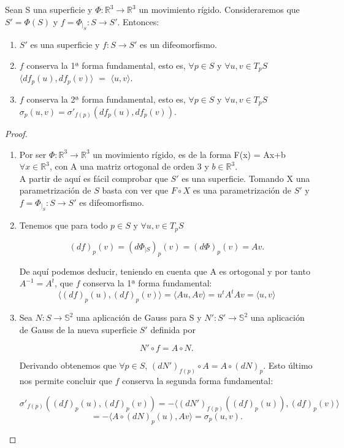 \begin{proposicion}\label{prop:rig1}
	Sean S una superficie y  $\Phi : \mathbb{R}^3 \to \mathbb{R}^3$  un movimiento rígido. Consideraremos que $S' = \Phi(S)$ y $f = \Phi_{\mid_{S}} : S \to S'$. Entonces:
	\begin{enumerate}
		\item $S'$ es una superficie y $f : S \to S'$ es un difeomorfismo.
		\item $f$ conserva la 1ª forma fundamental, esto es, $\forall p \in S$ y $\forall u,v \in T_p S$ $\langle df_p(u), df_p(v) \rangle $ $=$ $ \langle u, v \rangle$.
		\item $f$ conserva la 2ª forma fundamental, esto es, $\forall p \in S$ y $\forall u,v \in T_p S$ $\sigma_p(u,v) = \sigma'_{f(p)}(df_p(u), df_p(v))$.
	\end{enumerate}
\end{proposicion}

\begin{proof}
	${ }$%
	\begin{enumerate}
		\item Por ser $ \Phi : \mathbb{R}^3 \to \mathbb{R}^3 $ un movimiento rígido, es de la forma F(x) = Ax+b $\forall x \in \mathbb{R}^3$, con A una matriz ortogonal de orden 3 y $b \in \mathbb{R}^3$.
		${ }$\\
		A partir de aquí es fácil comprobar que $S'$ es una superficie. Tomando X una parametrización de $S$ basta con ver que $F\circ X$ es una parametrización de $S'$ y $f = \Phi_{\mid_{S}} : S \to S'$ es difeomorfismo.
		${ }$\\
		
		\item Tenemos que para todo $p \in S$ y $\forall u, v \in T_p S$
		
		\[
		(df)_p(v) = (d\Phi_{\mid S})_p(v) = (d\Phi)_p(v) = Av.
		\]
		
		De aquí podemos deducir, teniendo en cuenta que A es ortogonal y por tanto $A^{-1} = A^t$, que $f$ conserva la 1ª forma fundamental:
		\[
		\langle (df)_p(u), (df)_p(v) \rangle = \langle Au, Av \rangle = u^tA^tAv = \langle u, v \rangle
		\]
		
		\item Sea $N : S \to \mathbb{S}^2$ una aplicación de Gauss para S y $N' : S' \to \mathbb{S}^2$ una aplicación de Gauss de la nueva superficie $S'$ definida por
		
		\[
		N'\circ f = A\circ N.
		\]
		
		Derivando obtenemos que $\forall p \in S$,  $(dN')_{f(p)}\circ A = A \circ (dN)_p$. Esto último nos permite concluir que $f$ conserva la segunda forma fundamental:
		
		\[
		\sigma'_{f(p)}((df)_p(u), (df)_p(v)) = - \langle (dN')_{f(p)}((df)_p(u)), (df)_p(v) \rangle
		\]
		\[
		= - \langle A\circ(dN)_p(u), Av \rangle = \sigma_p(u, v).
		\]
	\end{enumerate}
\end{proof}
${ }$\\

